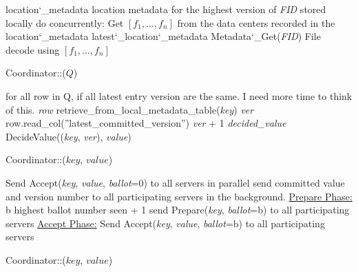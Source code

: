 \begin{algorithm}
  \DontPrintSemicolon
  location\char`_metadata \LAR location metadata for the highest version of {\em FID} stored locally\;
  do concurrently:\;
  Get $[f_1, ..., f_n]$ from the data centers recorded in the location\char`_metadata\;
  latest\char`_location\char`_metadata \LAR Metadata\char`_Get({\em FID})\;
   {
    File \LAR decode using $[f_1, ..., f_n]$\;
    \;
  } 
  \caption{Coordinator::($Q$) }
  \label{alg:coordinator}
\end{algorithm}

\begin{algorithm}
  \DontPrintSemicolon
  for all row in Q, if all latest entry version are the same. I need more time to think of this.
  {\em row} \LAR retrieve\_from\_local\_metadata\_table({\em key}) \;
  {\em ver} \LAR row.read\_col(''latest\_committed\_version'')\;
   { 
     {\em ver}  + 1 \;
     {\em decided\_value} \LAR DecideValue(({\em key}, {\em ver}), {\em value})
  }
   \;
  \caption{Coordinator::($key$, $value$) }
\end{algorithm}


\begin{algorithm}
  \DontPrintSemicolon
  Send Accept({\em key}, {\em value}, {\em ballot}=0) to all servers in parallel\;
   {
     send committed value and version number to all participating servers in the background.\;
    \;
  } 
  \underline{Prepare Phase:}\;
  b \LAR highest ballot number seen + 1\;
  send Prepare({\em key}, {\em ballot}=b) to all participating servers\;
   
  \underline{Accept Phase:}\;
  Send Accept({\em key}, {\em value}, {\em ballot}=b) to all participating servers\;
   
 
  \caption{Coordinator::($key$, $value$) }
  \label{alg:coordinator}
\end{algorithm}


